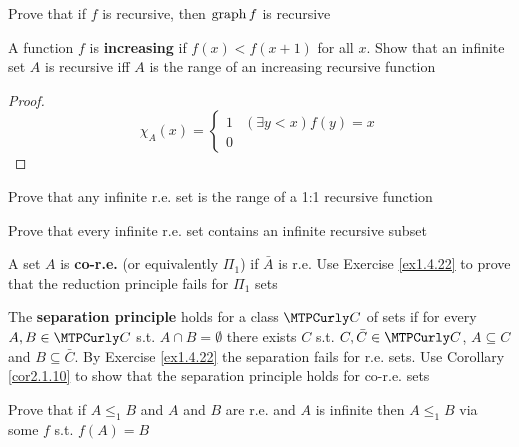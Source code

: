 \documentclass[11pt]{article}
\begin{document}
\begin{exercise}
\label{ex2.1.18}
Prove that if \(f\) is recursive, then \(\operatorname{graph} f\) is recursive
\end{exercise}

\begin{exercise}
\label{ex2.1.19}
A function \(f\) is \textbf{increasing} if \(f(x)<f(x+1)\) for all \(x\). Show that
an infinite set \(A\) is recursive iff \(A\) is the range of an increasing
recursive function
\end{exercise}

\begin{proof}
\begin{equation*}
\chi_A(x)=
\begin{cases}
1&(\exists y<x)f(y)=x\\
0
\end{cases}
\end{equation*}
\end{proof}

\begin{exercise}
\label{ex2.1.20}
Prove that any infinite r.e. set is the range of a 1:1 recursive function
\end{exercise}

\begin{exercise}
\label{ex2.1.21}
Prove that every infinite r.e. set contains an infinite recursive subset
\end{exercise}

\begin{exercise}
\label{ex2.1.22}
A set \(A\) is \textbf{co-r.e.} (or equivalently \(\Pi_1\)) if \(\bar{A}\) is r.e.
Use Exercise \ref{ex1.4.22} to prove that the reduction principle fails for \(\Pi_1\) sets
\end{exercise}

\begin{exercise}
\label{ex2.1.23}
The \textbf{separation principle} holds for a class \(\calc\) of sets if for every
\(A,B\in\calc\) s.t. \(A\cap B=\emptyset\) there exists \(C\) s.t.
\(C,\bar{C}\in\calc\), \(A\subseteq C\) and \(B\subseteq\bar{C}\). By
Exercise \ref{ex1.4.22} the separation fails  for r.e. sets. Use Corollary
\ref{cor2.1.10} to show that the separation principle holds for co-r.e. sets
\end{exercise}

\begin{exercise}
\label{ex2.1.24}
Prove that if \(A\le_1 B\) and \(A\) and \(B\) are r.e. and \(A\) is
infinite then \(A\le_1 B\) via some \(f\) s.t. \(f(A)=B\)
\end{exercise}
\end{document}
